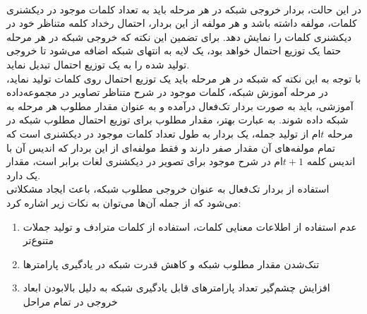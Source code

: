 \\
در این حالت، بردار خروجی شبکه در هر مرحله باید به تعداد کلمات موجود در دیکشنری کلمات، مولفه داشته باشد و هر مولفه از این بردار، احتمال رخداد کلمه متناظر خود در دیکشنری کلمات را نمایش دهد. برای تضمین این نکته که خروجی شبکه در هر مرحله حتما یک توزیع احتمال خواهد بود، یک لایه  به انتهای شبکه اضافه می‌شود تا خروجی تولید شده را به یک توزیع احتمال تبدیل نماید.
\\
با توجه به این نکته که شبکه در هر مرحله باید یک توزیع احتمال روی کلمات تولید نماید، در مرحله آموزش شبکه، کلمات موجود در شرح متناظر تصاویر در مجموعه‌داده آموزشی، باید به صورت بردار تک‌فعال درآمده و به عنوان مقدار مطلوب هر مرحله به شبکه داده شوند. به عبارت بهتر، مقدار مطلوب برای توزیع احتمال مطلوب شبکه در مرحله $t$ام از تولید جمله، یک بردار به طول تعداد کلمات موجود در دیکشنری است که تمام مولفه‌های آن مقدار صفر دارند و فقط مولفه‌ای از این بردار که اندیس آن با اندیس کلمه $t+1$ام در شرح موجود برای تصویر در دیکشنری لغات برابر است، مقدار یک دارد.
\\
استفاده از بردار تک‌فعال به عنوان خروجی مطلوب شبکه، باعث ایجاد مشکلاتی می‌شود که از جمله آن‌ها می‌توان به نکات زیر اشاره کرد:
\begin{enumerate}
	\item عدم استفاده از اطلاعات معنایی کلمات، استفاده از کلمات مترادف و تولید جملات متنوع‌تر
	\item تنک‌شدن مقدار مطلوب شبکه و کاهش قدرت شبکه در یادگیری پارامترها
	\item افزایش چشم‌گیر تعداد پارامترهای قابل یادگیری شبکه به دلیل بالابودن ابعاد خروجی در تمام مراحل
\end{enumerate}

